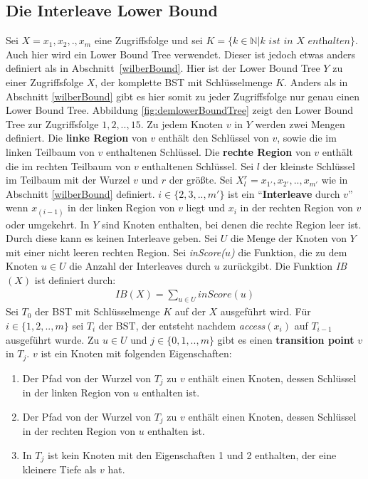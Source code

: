 \documentclass[a4paper,12pt]{article}
\begin{document}
\subsection{Die Interleave Lower Bound} \label{interBound}
Sei $X = x_1,x_2,.,x_m$ eine Zugriffsfolge und sei $K = \{k \in \mathbb{N} \vert k \textit{ ist in $X$ enthalten}\}$. Auch hier wird ein Lower Bound Tree verwendet. Dieser ist jedoch etwas anders definiert als in \mbox{Abschnitt \ref{wilberBound}}. Hier ist der Lower Bound Tree $Y$ zu einer Zugriffsfolge $X$, der komplette BST mit Schlüsselmenge $K$. Anders als in Abschnitt \ref{wilberBound}  gibt es hier somit zu jeder Zugriffsfolge nur genau einen Lower Bound Tree. Abbildung \ref{fig:demlowerBoundTree} zeigt den Lower Bound Tree zur Zugriffsfolge $1, 2,.., 15$. Zu jedem Knoten $v$ in $Y$ werden zwei Mengen definiert. Die \textbf{linke Region} von $v$ enthält den Schlüssel von $v$, sowie die im linken Teilbaum von $v$ enthaltenen Schlüssel.  Die \textbf{rechte Region} von $v$ enthält die im rechten Teilbaum von $v$ enthaltenen Schlüssel. Sei $l$ der kleinste Schlüssel im Teilbaum mit der Wurzel $v$ und $r$ der größte. Sei  $X^r_l = {x_{1'},x_{2'},..,x_{m'}}$ wie in Abschnitt \ref{wilberBound} definiert. $i \in \{2,3,..,m'\}$ ist ein \enquote{\textbf{Interleave} durch $v$} wenn $x_{\left(i -1\right)}$ in der linken Region von $v$ liegt und $x_i$ in der rechten Region von $v$ oder umgekehrt. In $Y$ sind Knoten enthalten, bei denen die rechte Region leer ist. Durch diese kann es keinen Interleave geben. Sei $U$ die Menge der Knoten von $Y$ mit einer nicht leeren rechten Region. Sei \textit{inScore($u$)} die Funktion, die zu dem Knoten $u \in U$ die Anzahl der Interleaves durch $u$ zurückgibt.  Die Funktion \textit{IB}$\left(X\right)$ ist definiert durch:
\begin{align*}
\mathit{IB}\left(X\right) = \sum_{u \in U} \mathit{inScore}\left(u\right)
\end{align*}
Sei $T_0$ der BST mit Schlüsselmenge $K$ auf der $X$ ausgeführt wird. Für $i \in \{1,2,..,m\}$ sei $T_i$ der BST, der entsteht nachdem \textit{access}$\left(x_i\right)$ auf $T_{i-1}$ ausgeführt wurde. Zu $u \in U$ und  $j \in \{0,1,..,m\}$ gibt es einen \textbf{transition point} $v$ in $T_j$. $v$ ist ein Knoten mit folgenden Eigenschaften:\\
\begin{enumerate}
	\item Der Pfad von der Wurzel von $T_j$ zu $v$ enthält einen Knoten, dessen Schlüssel in der linken Region von $u$ enthalten ist.
	\item Der Pfad von der Wurzel von $T_j$ zu $v$ enthält einen Knoten, dessen Schlüssel in der rechten Region von $u$ enthalten ist.
	\item In $T_j$ ist kein Knoten mit den Eigenschaften 1 und 2 enthalten, der eine kleinere Tiefe als $v$ hat. 
\end{enumerate}
\end{document}
